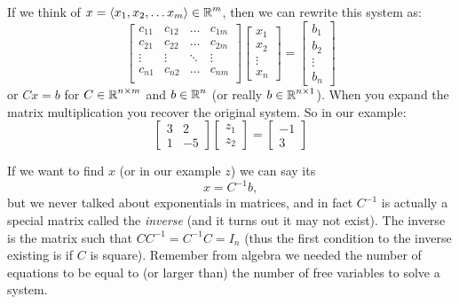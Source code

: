 If we think of $x = \langle x_1, x_2, \hdots x_m\rangle \in \operatorname{\mathbb{R}}^m$, then we can rewrite this system as: 
\[
\left[\begin{matrix}
c_{11} & c_{12} & \hdots & c_{1m}\\
c_{21} & c_{22} & \hdots & c_{2m}\\
\vdots & \vdots & \ddots & \vdots\\
c_{n1} & c_{n2} & \hdots & c_{nm}\\
\end{matrix}\right]
\left[\begin{matrix} x_1 \\ x_2 \\ \vdots \\ x_n \end{matrix}\right]
 = 
\left[\begin{matrix} b_1 \\ b_2 \\ \vdots \\ b_n \end{matrix}\right]
\]
or $Cx=b$ for $C\in\operatorname{\mathbb{R}}^{n\times m}$ and $b\in\operatorname{\mathbb{R}}^n$ (or really $b\in\operatorname{\mathbb{R}}^{n\times 1}$).
When you expand the matrix multiplication you recover the original system. 
So in our example: 
\[
\left[\begin{matrix} 3 & 2 \\ 1 & -5\end{matrix}\right]
\left[\begin{matrix} z_1 \\ z_2 \end{matrix}\right] = 
\left[\begin{matrix} -1 \\ 3\end{matrix}\right]
\]

If we want to find $x$ (or in our example $z$) 
we can say its \[x = C^{-1}b,\] 
but we never talked about exponentials in matrices, and in fact $C^{-1}$ is actually a special matrix 
called the \emph{inverse} (and it turns out it may not exist). 
The inverse is the matrix such that $CC^{-1} = C^{-1}C = I_n$ (thus the first condition to the inverse existing is if $C$ is square).
Remember from algebra we needed the number of equations to be equal to (or larger than) the number of free variables to solve a system. 

